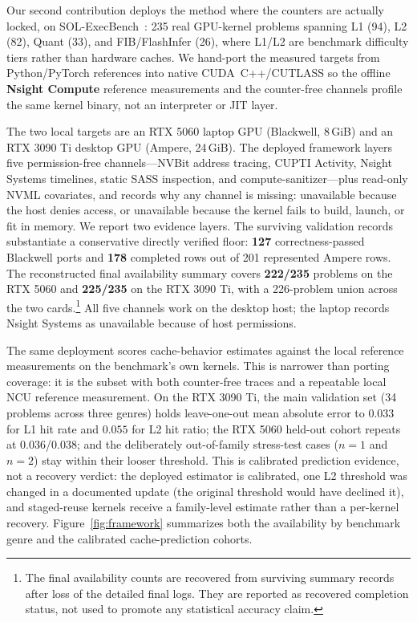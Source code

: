 \documentclass[conference]{IEEEtran}
\begin{document}
Our second contribution deploys the method where the counters are actually
locked, on SOL-ExecBench~\cite{nvidia2026solexecbench}: 235 real GPU-kernel
problems spanning L1 (94), L2 (82), Quant (33), and FIB/FlashInfer (26), where
L1/L2 are benchmark difficulty tiers rather than hardware caches. We hand-port
the measured targets from Python/PyTorch references into native CUDA~C++/CUTLASS so the
offline \textbf{Nsight Compute} reference measurements and the counter-free channels profile
the same kernel binary, not an interpreter or JIT layer.

The two local targets are an RTX 5060 laptop GPU (Blackwell, 8\,GiB) and an RTX
3090 Ti desktop GPU (Ampere, 24\,GiB). The deployed framework layers five
permission-free channels---NVBit address tracing, CUPTI Activity, Nsight
Systems timelines, static SASS inspection, and compute-sanitizer---plus
read-only NVML covariates, and records why any channel is missing: unavailable
because the host denies access, or unavailable because the kernel fails to
build, launch, or fit in memory. We report two evidence layers. The surviving
validation records substantiate a conservative directly verified floor:
\textbf{127} correctness-passed Blackwell ports and \textbf{178}
completed rows out of 201 represented Ampere rows. The
reconstructed final availability summary covers \textbf{222/235} problems on
the RTX 5060 and \textbf{225/235} on the RTX 3090 Ti, with a 226-problem
union across the two cards.\footnote{The final availability counts are
recovered from surviving summary records after loss of the detailed final
logs. They are reported as recovered completion status, not used to promote
any statistical accuracy claim.} All five channels work on the desktop host;
the laptop records Nsight Systems as unavailable because of host permissions.

The same deployment scores cache-behavior estimates against the local reference
measurements on the benchmark's own kernels. This is narrower than porting coverage:
it is the subset with both counter-free traces and a repeatable local NCU
reference measurement. On the RTX 3090 Ti, the main validation set
(34 problems across three genres) holds leave-one-out mean absolute error to
$0.033$ for L1 hit rate and $0.055$ for L2 hit ratio; the RTX 5060 held-out
cohort repeats at $0.036$/$0.038$; and the deliberately out-of-family
stress-test cases ($n{=}1$ and $n{=}2$) stay within their looser threshold.
This is calibrated prediction evidence, not a recovery verdict: the deployed
estimator is calibrated, one L2 threshold was changed in a documented update
(the original threshold would have declined it), and staged-reuse kernels
receive a family-level estimate rather than a per-kernel recovery.
Figure~\ref{fig:framework} summarizes both the availability by
benchmark genre and the calibrated cache-prediction cohorts.
\end{document}
